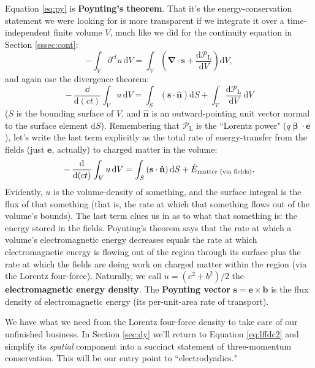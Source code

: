 \documentclass[12pt]{article}
\renewcommand{\vv}[1]{\mathbf{#1}}
\newcommand{\dd}[1]{\mathrm{d}#1}
\newcommand{\vvbeta}{\bm{\upbeta}}
\newcommand{\del}{\boldsymbol{\nabla}}
\begin{document}
Equation \ref{eq:py} is \textbf{Poynting's theorem}. That it's the energy-conservation statement we were looking for is more transparent if we integrate it over a time-independent finite volume $V$, much like we did for the continuity equation in Section \ref{sssec:cont}:
\begin{equation*}
- \int_V \partial^{ct} u \, \dd V = \int_V \left(  \del \cdot \vv s + \dfrac{\dd \mathcal{P}_{\textrm{L}}}{\dd V} \right) \dd V ,
\end{equation*}
and again use the divergence theorem:
\begin{equation*}
- \, \dfrac{\dd}{\dd (ct)} \int_V u \, \dd V = \int_S \left( \vv s \cdot \vv{\hat{n}} \right) \dd S + \int_V \dfrac{\dd \mathcal{P}_{\textrm{L}}}{\dd V} \, \dd V
\end{equation*}
($S$ is the bounding surface of $V$, and $\vv{\hat{n}}$ is an outward-pointing unit vector normal to the surface element $\dd S$). Remembering that $\mathcal{P}_{\textrm{L}}$ is the ``Lorentz power" ($q \vvbeta \cdot \vv e$), let's write the last term explicitly as the total rate of energy-transfer from the fields (just $\vv e$, actually) to charged matter in the volume:
\begin{equation*}
- \, \dfrac{\dd}{\dd (ct)} \int_V u \, \dd V = \int_S \left( \vv s \cdot \vv{\hat{n}} \right) \dd S + \dot{E}_{\mkern1mu \textrm{matter (via fields)}} .
\end{equation*}
Evidently, $u$ is the volume-density of something, and the surface integral is the flux of that something (that is, the rate at which that something flows out of the volume's bounds). The last term clues us in as to what that something is: the energy stored in the fields. Poynting's theorem says that the rate at which a volume's electromagnetic energy decreases equals the rate at which electromagnetic energy is flowing out of the region through its surface plus the rate at which the fields are doing work on charged matter within the region (via the Lorentz four-force). Naturally, we call ${u = (e^2 + b^2)/2}$ the \textbf{electromagnetic energy density}. The \textbf{Poynting vector} ${\vv s = \vv e \times \vv b}$ is the flux density of electromagnetic energy (its per-unit-area rate of transport).

We have what we need from the Lorentz four-force density to take care of our unfinished business. In Section \ref{sec:dy} we'll return to Equation \ref{eq:lffdc2} and simplify its \emph{spatial} component into a succinct statement of three-momentum conservation. This will be our entry point to ``electrodyadics."
\end{document}

